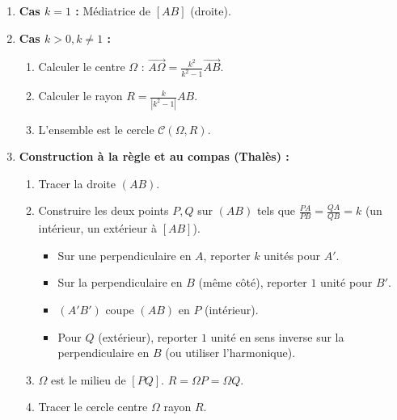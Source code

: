 \documentclass[11pt]{article}
\begin{document}
\begin{methode}[Ligne de niveau $\mathcal{A}_k = \{ M \mid \frac{MA}{MB} = k \}$]
\begin{enumerate}
    \item \textbf{Cas $k = 1$ :} Médiatrice de $[AB]$ (droite).
    \item \textbf{Cas $k > 0, k \neq 1$ :}
    \begin{enumerate}
        \item Calculer le centre $\Omega$ : $\overrightarrow{A\Omega} = \frac{k^2}{k^2-1} \overrightarrow{AB}$.
        \item Calculer le rayon $R = \frac{k}{|k^2-1|} AB$.
        \item L'ensemble est le cercle $\mathcal{C}(\Omega, R)$.
    \end{enumerate}
    \item \textbf{Construction à la règle et au compas (Thalès) :}
    \begin{enumerate}
        \item Tracer la droite $(AB)$.
        \item Construire les deux points $P, Q$ sur $(AB)$ tels que $\frac{PA}{PB} = \frac{QA}{QB} = k$ (un intérieur, un extérieur à $[AB]$).
        \begin{itemize}
            \item Sur une perpendiculaire en $A$, reporter $k$ unités pour $A'$.
            \item Sur la perpendiculaire en $B$ (même côté), reporter $1$ unité pour $B'$.
            \item $(A'B')$ coupe $(AB)$ en $P$ (intérieur).
            \item Pour $Q$ (extérieur), reporter $1$ unité en sens inverse sur la perpendiculaire en $B$ (ou utiliser l'harmonique).
        \end{itemize}
        \item $\Omega$ est le milieu de $[PQ]$. $R = \Omega P = \Omega Q$.
        \item Tracer le cercle centre $\Omega$ rayon $R$.
    \end{enumerate}
\end{enumerate}
\end{methode}
\end{document}
